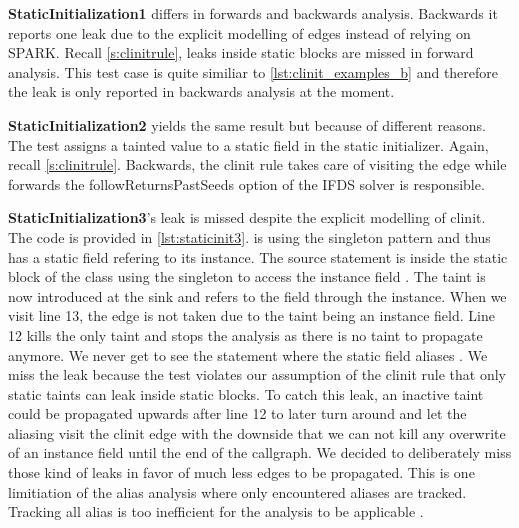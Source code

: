 \documentclass[../draft.tex]{subfiles}
\begin{document}
    \textbf{StaticInitialization1} differs in forwards and backwards analysis. Backwards it reports one leak due to the explicit modelling of  edges instead of relying on SPARK. Recall \autoref{s:clinitrule}, leaks inside static blocks are missed in forward analysis. This test case is quite similiar to \autoref{lst:clinit_examples_b} and therefore the leak is only reported in backwards analysis at the moment.
    
    \textbf{StaticInitialization2} yields the same result but because of different reasons. The test assigns a tainted value to a static field in the static initializer. Again, recall \autoref{s:clinitrule}. Backwards, the clinit rule takes care of visiting the  edge while forwards the followReturnsPastSeeds option of the IFDS solver is responsible. 

    \textbf{StaticInitialization3}'s leak is missed despite the explicit modelling of clinit. The code is provided in \autoref{lst:staticinit3}.  is using the singleton pattern and thus has a static field  refering to its instance. The source statement is inside the static block of the  class using the singleton to access the instance field .
    The taint is now introduced at the sink and refers to the field through the  instance. When we visit line 13, the  edge is not taken due to the taint being an instance field. Line 12 kills the only taint and stops the analysis as there is no taint to propagate anymore. We never get to see the statement where the static field  aliases . 
    We miss the leak because the test violates our assumption of the clinit rule that only static taints can leak inside static blocks. To catch this leak, an inactive taint could be propagated upwards after line 12 to later turn around and let the aliasing visit the clinit edge with the downside that we can not kill any overwrite of an instance field until the end of the callgraph. We decided to deliberately miss those kind of leaks in favor of much less edges to be propagated. This is one limitiation of the alias analysis where only encountered aliases are tracked. Tracking all alias is too inefficient for the analysis to be applicable \cite{Bodden2012}.  
    
\end{document}
